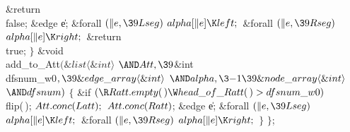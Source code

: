 \&{return} \\{false};\2\7
\&{edge} \|e;\7
\&{forall} ${}(\|e,\39\\{Lseg}){}$\1\5
${}\\{alpha}[\|e]\K\\{left};{}$\2\6
\&{forall} ${}(\|e,\39\\{Rseg}){}$\1\5
${}\\{alpha}[\|e]\K\\{right};{}$\2\6
\&{return} \\{true};\6
\4${}\}{}$\2\7
\&{void} \\{add\_to\_Att}${}(\&{list}\langle\&{int}\rangle{}$ ${}{\AND}\\{Att},%
\39{}$\&{int} \\{dfsnum\_w0}${},\39\&{edge\_array}\langle\&{int}\rangle{}$ ${}{%
\AND}\\{alpha},\3{-1}\39\&{node\_array}\langle\&{int}\rangle{}$ ${}{\AND}%
\\{dfsnum}){}$\1\1\2\2\6
${}\{{}$\1\6
\&{if} ${}(\R\\{Ratt}.\\{empty}(\,)\W\\{head\_of\_Ratt}(\,)>\\{dfsnum\_w0}){}$%
\1\5
\\{flip}(\,);\2\6
${}\\{Att}.\\{conc}(\\{Latt});{}$\6
${}\\{Att}.\\{conc}(\\{Ratt}){}$;\7
\&{edge} \|e;\7
\&{forall} ${}(\|e,\39\\{Lseg}){}$\1\5
${}\\{alpha}[\|e]\K\\{left};{}$\2\6
\&{forall} ${}(\|e,\39\\{Rseg}){}$\1\5
${}\\{alpha}[\|e]\K\\{right};{}$\2\6
\4${}\}{}$\2\2\6
${}\}{}$;\par
\fi

